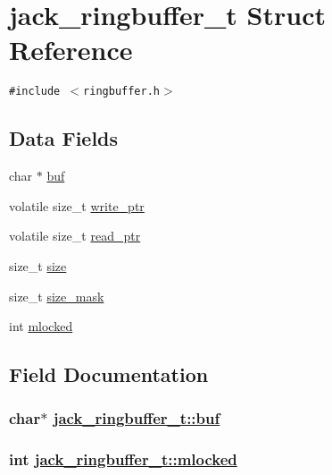 \hypertarget{structjack__ringbuffer__t}{
\section{jack\_\-ringbuffer\_\-t Struct Reference}
\label{structjack__ringbuffer__t}
}
{\tt \#include $<$ringbuffer.h$>$}

\subsection*{Data Fields}
\begin{CompactItemize}
\item 
char $\ast$ \hyperlink{structjack__ringbuffer__t_cb7e52b21171fb9a53b498202607f0bd}{buf}
\item 
volatile size\_\-t \hyperlink{structjack__ringbuffer__t_9ecd600e9f148f5d6b55f335b3466c2e}{write\_\-ptr}
\item 
volatile size\_\-t \hyperlink{structjack__ringbuffer__t_ec57ab29388b672b9cbf9449db49d3fd}{read\_\-ptr}
\item 
size\_\-t \hyperlink{structjack__ringbuffer__t_f7bd60b75b29d79b660a2859395c1a24}{size}
\item 
size\_\-t \hyperlink{structjack__ringbuffer__t_a9eab63ea367d985becc6f47c312addd}{size\_\-mask}
\item 
int \hyperlink{structjack__ringbuffer__t_2e2fe48672a172e59ebb50eb04ddbea4}{mlocked}
\end{CompactItemize}


\subsection{Field Documentation}
\hypertarget{structjack__ringbuffer__t_cb7e52b21171fb9a53b498202607f0bd}{
\subsubsection[buf]{\setlength{\rightskip}{0pt plus 5cm}char$\ast$ \hyperlink{structjack__ringbuffer__t_cb7e52b21171fb9a53b498202607f0bd}{jack\_\-ringbuffer\_\-t::buf}}}
\label{structjack__ringbuffer__t_cb7e52b21171fb9a53b498202607f0bd}


\hypertarget{structjack__ringbuffer__t_2e2fe48672a172e59ebb50eb04ddbea4}{
\subsubsection[mlocked]{\setlength{\rightskip}{0pt plus 5cm}int \hyperlink{structjack__ringbuffer__t_2e2fe48672a172e59ebb50eb04ddbea4}{jack\_\-ringbuffer\_\-t::mlocked}}}
\label{structjack__ringbuffer__t_2e2fe48672a172e59ebb50eb04ddbea4}


